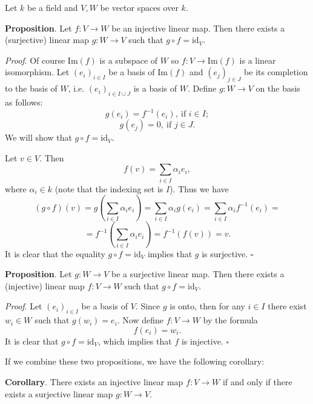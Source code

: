 \documentclass[12pt]{article}
\begin{document}
Let $k$ be a field and $V,W$ be vector spaces over $k$.

\textbf{Proposition}. Let $f:V\to W$ be an injective linear map. Then there exists a (surjective) linear map $g:W\to V$ such that $g\circ f=\mathrm{id}_{V}$.

\textit{Proof}. Of course $\mathrm{Im}(f)$ is a subspace of $W$ so $f:V\to\mathrm{Im}(f)$ is a linear isomorphism. Let $(e_i)_{i\in I}$ be a basis of $\mathrm{Im}(f)$ and $(e_j)_{j\in J}$ be its completion to the basis of $W$, i.e. $(e_i)_{i\in I\cup J}$ is a basis of $W$. Define $g:W\to V$ on the basis as follows:
$$g(e_i)=f^{-1}(e_i),\ \mbox{if } i\in I;$$
$$g(e_j)=0,\ \mbox{if } j\in J.$$
We will show that $g\circ f=\mathrm{id}_{V}$.

Let $v\in V$. Then $$f(v)=\sum_{i\in I}\alpha_{i}e_i,$$
where $\alpha_{i}\in k$ (note that the indexing set is $I$). Thus we have $$(g\circ f)(v)=g(\sum_{i\in I}\alpha_{i}e_i)=\sum_{i\in I}\alpha_{i}g(e_i)=\sum_{i\in I}\alpha_{i}f^{-1}(e_i)=$$
$$=f^{-1}(\sum_{i\in I}\alpha_{i}e_i)=f^{-1}(f(v))=v.$$
It is clear that the equality $g\circ f=\mathrm{id}_{V}$ implies that $g$ is surjective. $\square$

\textbf{Proposition}. Let $g:W\to V$ be a surjective linear map. Then there exists a (injective) linear map $f:V\to W$ such that $g\circ f=\mathrm{id}_{V}$.

\textit{Proof}. Let $(e_{i})_{i\in I}$ be a basis of $V$. Since $g$ is onto, then for any $i\in I$ there exist $w_{i}\in W$ such that $g(w_{i})=e_{i}$.
Now define $f:V\to W$ by the formula $$f(e_{i})=w_{i}.$$
It is clear that $g\circ f=\mathrm{id}_{V}$, which implies that $f$ is injective. $\square$

If we combine these two propositions, we have the following corollary:

\textbf{Corollary}. There exists an injective linear map $f:V\to W$ if and only if there exists a surjective linear map $g:W\to V$.
\end{document}
